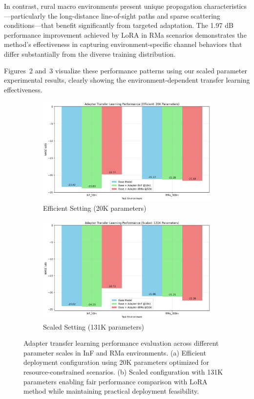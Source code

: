 \documentclass[conference]{IEEEtran}
\begin{document}
In contrast, rural macro environments present unique propagation characteristics—particularly the long-distance line-of-sight paths and sparse scattering conditions—that benefit significantly from targeted adaptation. The 1.97 dB performance improvement achieved by LoRA in RMa scenarios demonstrates the method's effectiveness in capturing environment-specific channel behaviors that differ substantially from the diverse training distribution.

Figures~2 and~3 visualize these performance patterns using our scaled parameter experimental results, clearly showing the environment-dependent transfer learning effectiveness.

\begin{figure}[t]
\centering
\begin{subfigure}[b]{0.48\textwidth}
\centering
\includegraphics[width=\textwidth]{figures/adapter_efficient_final.png}
\caption{Efficient Setting (20K parameters)}
\label{fig:adapter_efficient}
\end{subfigure}
\hfill
\begin{subfigure}[b]{0.48\textwidth}
\centering
\includegraphics[width=\textwidth]{figures/adapter_scaled_final.png}
\caption{Scaled Setting (131K parameters)}
\label{fig:adapter_scaled}
\end{subfigure}
\caption{Adapter transfer learning performance evaluation across different parameter scales in InF and RMa environments. (a) Efficient deployment configuration using 20K parameters optimized for resource-constrained scenarios. (b) Scaled configuration with 131K parameters enabling fair performance comparison with LoRA method while maintaining practical deployment feasibility.}
\label{fig:adapter_performance}
\end{figure}
\end{document}
